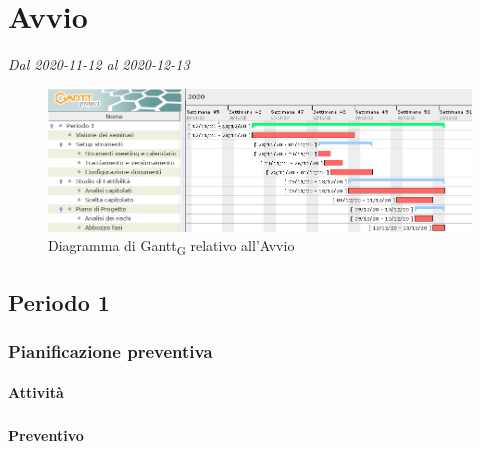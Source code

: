 \section{Avvio}
\textit{Dal 2020-11-12 al 2020-12-13}

\begin{figure}[H]
	\centering
	\includegraphics[scale=0.62]{res/images/gantt_fase/01_gantt_avvio.png}
	\caption{Diagramma di Gantt\textsubscript{G} relativo all'Avvio}
\end{figure}


\subsection{Periodo 1}

\subsubsection{Pianificazione preventiva}



\paragraph{Attività}
\subparagraph*{}

\planningTable{
	
}



\paragraph{Preventivo}
\subparagraph*{}

